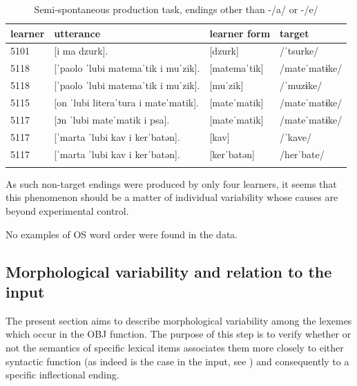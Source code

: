 \begin{table}
    \begin{tabularx}{\textwidth}{llll}
        \lsptoprule
        learner & utterance & learner form & target\\
        \midrule
        5101 & [i ma dzurk]. & [dzurk] & /ˈtsurke/\\
        5118 & [ˈpaolo ˈlubi matemaˈtik i muˈzik]. & [matemaˈtik] & /mateˈmatɨke/\\
        5118 & [ˈpaolo ˈlubi matemaˈtik i muˈzik]. & [muˈzik] & /ˈmuzɨke/\\
        5115 & [on ˈlubi literaˈtura i mateˈmatik]. & [mateˈmatik] & /mateˈmatɨke/\\
        5117 & [ɔn ˈlubi mateˈmatik i psa]. & [mateˈmatik] & /mateˈmatɨke/\\
        5117 & [ˈmarta ˈlubi kav i kerˈbatən]. & [kav] & /ˈkave/\\
        5117 & [ˈmarta ˈlubi kav i kerˈbatən]. & [kerˈbatən] & /herˈbate/\\
        \lspbottomrule
    \end{tabularx}
    \caption{Semi-spontaneous production task, endings other than -/a/ or -/e/}
    \label{tab:07:1}
\end{table}

As such non-target endings were produced by only four learners, it seems that this phenomenon should be a matter of individual variability whose causes are beyond experimental control. 

No examples of OS word order were found in the data. 

\subsection{Morphological variability and relation to the input}\label{sec:07:2.1}

The present section aims to describe morphological variability among the lexemes which occur in the OBJ function. The purpose of this step is to verify whether or not the semantics of specific lexical items associates them more closely to either syntactic function (as indeed is the case in the input, see ) and consequently to a specific inflectional ending.

